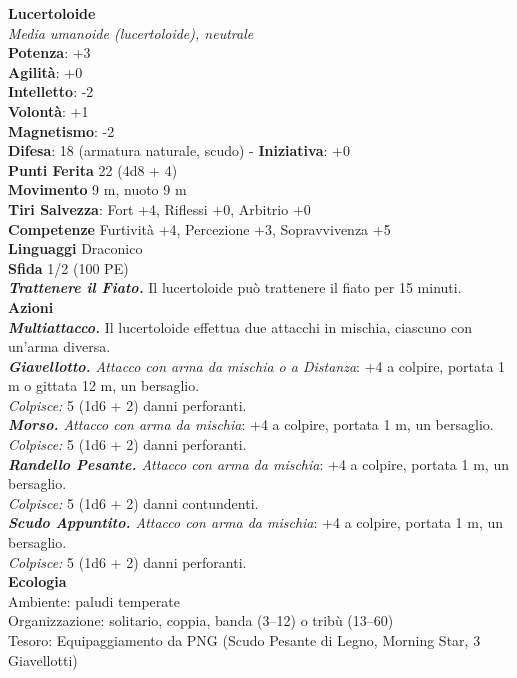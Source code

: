 \begin{multicols}{2}
\medskip\textbf{Lucertoloide}\\
\emph{Media umanoide (lucertoloide), neutrale}\\
\textbf{Potenza}: +3\\
\textbf{Agilità}: +0\\
\textbf{Intelletto}: -2\\
\textbf{Volontà}: +1\\
\textbf{Magnetismo}: -2\\
\textbf{Difesa}: 18 (armatura naturale, scudo) - \textbf{Iniziativa}: +0\\
\textbf{Punti Ferita} 22 (4d8 + 4)\\
\textbf{Movimento} 9 m, nuoto 9 m\\
\textbf{Tiri Salvezza}: Fort +4, Riflessi +0, Arbitrio +0\\
\textbf{Competenze} Furtività +4, Percezione +3, Sopravvivenza +5\\
\textbf{Linguaggi} Draconico\\
\textbf{Sfida} 1/2 (100 PE)\smallskip\\

\emph{\textbf{Trattenere il Fiato.}} Il lucertoloide può trattenere il fiato per 15 minuti.\\
\smallskip\textbf{Azioni}\\
\emph{\textbf{Multiattacco.}} Il lucertoloide effettua due attacchi in mischia, ciascuno con un'arma diversa.\\
\emph{\textbf{Giavellotto.} Attacco con arma da mischia o a Distanza}: +4 a colpire, portata 1 m o gittata 12 m, un bersaglio. \\
\emph{Colpisce:} 5 (1d6 + 2) danni perforanti.\\
\emph{\textbf{Morso.} Attacco con arma da mischia}: +4 a colpire, portata 1 m, un bersaglio.\\
\emph{Colpisce:} 5 (1d6 + 2) danni perforanti.\\
\emph{\textbf{Randello Pesante.} Attacco con arma da mischia}: +4 a colpire, portata 1 m, un bersaglio.\\
\emph{Colpisce:} 5 (1d6 + 2) danni contundenti. \\
\emph{\textbf{Scudo Appuntito.} Attacco con arma da mischia}: +4 a colpire, portata 1 m, un bersaglio.\\
\emph{Colpisce:} 5 (1d6 + 2) danni perforanti.\\
\textbf{Ecologia}\\
Ambiente: paludi temperate\\
Organizzazione: solitario, coppia, banda (3–12) o tribù (13–60)\\
Tesoro: Equipaggiamento da PNG (Scudo Pesante di Legno, Morning Star, 3 Giavellotti)\\


\end{multicols}
